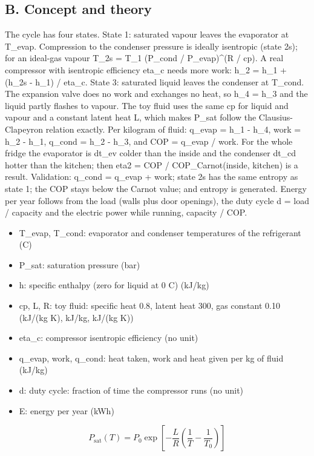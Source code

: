 \documentclass[11pt,a4paper]{article}
\begin{document}
\subsection*{B. Concept and theory}
The cycle has four states. State 1: saturated vapour leaves the evaporator at T\_evap. Compression to the condenser pressure is ideally isentropic (state 2s); for an ideal-gas vapour T\_2s = T\_1 (P\_cond / P\_evap)\textasciicircum{}(R / cp). A real compressor with isentropic efficiency eta\_c needs more work: h\_2 = h\_1 + (h\_2s - h\_1) / eta\_c. State 3: saturated liquid leaves the condenser at T\_cond. The expansion valve does no work and exchanges no heat, so h\_4 = h\_3 and the liquid partly flashes to vapour. The toy fluid uses the same cp for liquid and vapour and a constant latent heat L, which makes P\_sat follow the Clausius-Clapeyron relation exactly. Per kilogram of fluid: q\_evap = h\_1 - h\_4, work = h\_2 - h\_1, q\_cond = h\_2 - h\_3, and COP = q\_evap / work. For the whole fridge the evaporator is dt\_ev colder than the inside and the condenser dt\_cd hotter than the kitchen; then eta2 = COP / COP\_Carnot(inside, kitchen) is a result. Validation: q\_cond = q\_evap + work; state 2s has the same entropy as state 1; the COP stays below the Carnot value; and entropy is generated. Energy per year follows from the load (walls plus door openings), the duty cycle d = load / capacity and the electric power while running, capacity / COP.

\begin{itemize}[nosep]
\item T\_evap, T\_cond: evaporator and condenser temperatures of the refrigerant (C)
\item P\_sat: saturation pressure (bar)
\item h: specific enthalpy (zero for liquid at 0 C) (kJ/kg)
\item cp, L, R: toy fluid: specific heat 0.8, latent heat 300, gas constant 0.10 (kJ/(kg K), kJ/kg, kJ/(kg K))
\item eta\_c: compressor isentropic efficiency (no unit)
\item q\_evap, work, q\_cond: heat taken, work and heat given per kg of fluid (kJ/kg)
\item d: duty cycle: fraction of time the compressor runs (no unit)
\item E: energy per year (kWh)
\end{itemize}

\begin{equation*}
P_{\mathrm{sat}}(T)=P_0\exp\!\left[-\frac{L}{R}\left(\frac1T-\frac1{T_0}\right)\right]
\end{equation*}
\end{document}
